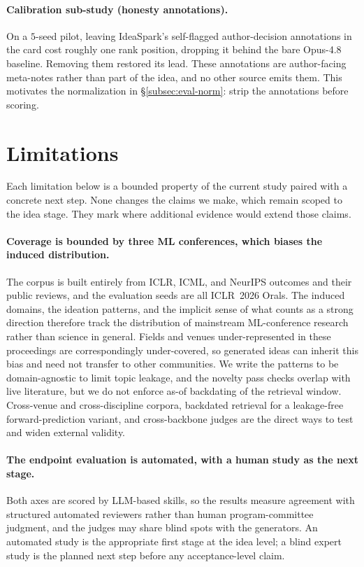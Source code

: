 \documentclass[10pt,a4paper]{article}
\begin{document}
\paragraph{Calibration sub-study (honesty annotations).} On a $5$-seed pilot, leaving IdeaSpark's self-flagged author-decision annotations in the card cost roughly one rank position, dropping it behind the bare Opus-4.8 baseline. Removing them restored its lead. These annotations are author-facing meta-notes rather than part of the idea, and no other source emits them. This motivates the normalization in \S\ref{subsec:eval-norm}: strip the annotations before scoring.

\section{Limitations}
\label{sec:limitations}

Each limitation below is a bounded property of the current study paired with a concrete next step. None changes the claims we make, which remain scoped to the idea stage. They mark where additional evidence would extend those claims.

\paragraph{Coverage is bounded by three ML conferences, which biases the induced distribution.} The corpus is built entirely from ICLR, ICML, and NeurIPS outcomes and their public reviews, and the evaluation seeds are all ICLR~2026 Orals. The induced domains, the ideation patterns, and the implicit sense of what counts as a strong direction therefore track the distribution of mainstream ML-conference research rather than science in general. Fields and venues under-represented in these proceedings are correspondingly under-covered, so generated ideas can inherit this bias and need not transfer to other communities. We write the patterns to be domain-agnostic to limit topic leakage, and the novelty pass checks overlap with live literature, but we do not enforce as-of backdating of the retrieval window. Cross-venue and cross-discipline corpora, backdated retrieval for a leakage-free forward-prediction variant, and cross-backbone judges are the direct ways to test and widen external validity.

\paragraph{The endpoint evaluation is automated, with a human study as the next stage.} Both axes are scored by LLM-based skills, so the results measure agreement with structured automated reviewers rather than human program-committee judgment, and the judges may share blind spots with the generators. An automated study is the appropriate first stage at the idea level; a blind expert study is the planned next step before any acceptance-level claim.
\end{document}
